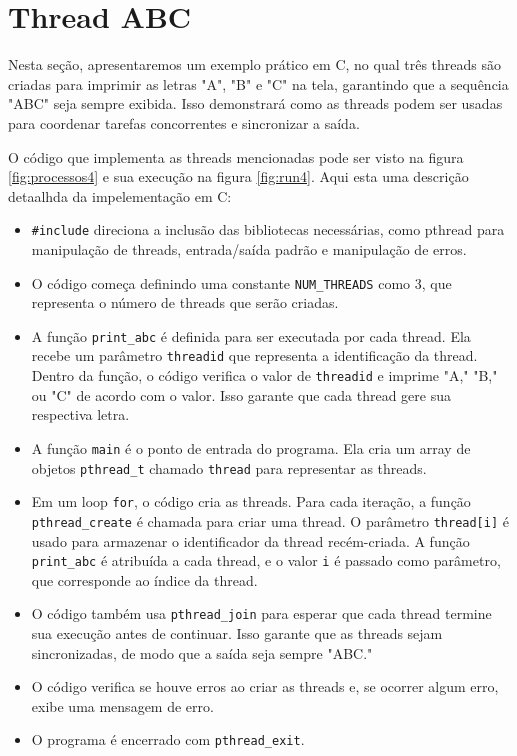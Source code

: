 \documentclass[
	12pt,				%
	openright,			%
	oneside,			%
	a4paper,			%
	chapter=TITLE,		%
	english,			%
	french,				%
	spanish,			%
	brazil				%
	]{abntex2}
\theoremstyle{definition}
\begin{document}
\section{Thread ABC}

Nesta seção, apresentaremos um exemplo prático em C, no qual três threads são 
criadas para imprimir as letras "A", "B" e "C" na tela, garantindo que 
a sequência "ABC" seja sempre exibida. Isso demonstrará como as threads 
podem ser usadas para coordenar tarefas concorrentes e sincronizar a saída.

O código que implementa as threads mencionadas pode ser visto na figura \ref{fig:processos4}
e sua execução na figura \ref{fig:run4}. Aqui esta uma descrição detaalhda da impelementação em C:

\begin{itemize}
    
    \item \texttt{\#include} direciona a inclusão das bibliotecas necessárias, como pthread para manipulação de threads, entrada/saída padrão e manipulação de erros.
    \item O código começa definindo uma constante \texttt{NUM\_THREADS} como 3, que representa o número de threads que serão criadas.
    \item A função \texttt{print\_abc} é definida para ser executada por cada thread. Ela recebe um parâmetro \texttt{threadid} que representa a identificação da thread. Dentro da função, o código verifica o valor de \texttt{threadid} e imprime "A," "B," ou "C" de acordo com o valor. Isso garante que cada thread gere sua respectiva letra.
    \item A função \texttt{main} é o ponto de entrada do programa. Ela cria um array de objetos \texttt{pthread\_t} chamado \texttt{thread} para representar as threads.
    \item Em um loop \texttt{for}, o código cria as threads. Para cada iteração, a função \texttt{pthread\_create} é chamada para criar uma thread. O parâmetro \texttt{thread[i]} é usado para armazenar o identificador da thread recém-criada. A função \texttt{print\_abc} é atribuída a cada thread, e o valor \texttt{i} é passado como parâmetro, que corresponde ao índice da thread. 
    \item O código também usa \texttt{pthread\_join} para esperar que cada thread termine sua execução antes de continuar. Isso garante que as threads sejam sincronizadas, de modo que a saída seja sempre "ABC."
    \item O código verifica se houve erros ao criar as threads e, se ocorrer algum erro, exibe uma mensagem de erro.
    \item O programa é encerrado com \texttt{pthread\_exit}.

\end{itemize}
\end{document}
